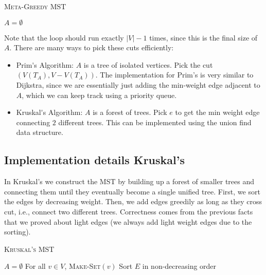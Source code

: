 \begin{algorithm}[H]
\DontPrintSemicolon
\SetNoFillComment

\caption{\textsc{Meta-Greedy MST}}\label{alg:mstgreedy}
$A = \emptyset$\;
\;
\end{algorithm}\medskip

Note that the loop should run exactly $\vert V\vert-1$ times, since this is the final size of $A$. There are many ways to pick these cuts efficiently: 
\begin{itemize}
    \item \ac{Prim's Algorithm}: $A$ is a tree of isolated vertices. Pick the cut $(V(T_A), V-V(T_A))$. The implementation for Prim's is very similar to Dijkstra, since we are essentially just adding the min-weight edge adjacent to $A$, which we can keep track using a priority queue. 
    \item \ac{Kruskal's Algorithm}: $A$ is a forest of trees. Pick $e$ to get the min weight edge connecting $2$ different trees. This can be implemented using the union find data structure. 
\end{itemize}

\subsection{Implementation details Kruskal's}

In Kruskal's we construct the MST by building up a forest of smaller trees and connecting them until they eventually become a single unified tree. First, we sort the edges by decreasing weight. Then, we add edges greedily as long as they cross cut, i.e., connect two different trees. Correctness comes from the previous facts that we proved about light edges (we always add light weight edges due to the sorting). \V

\begin{algorithm}[H]
\DontPrintSemicolon
\SetNoFillComment

\caption{\textsc{Kruskal's MST}}\label{alg:kruskal}
$A = \emptyset$\;
For all $v\in V$, \textsc{Make-Set}$(v)$\;
Sort $E$ in non-decreasing order\;
\;
\end{algorithm}\medskip

